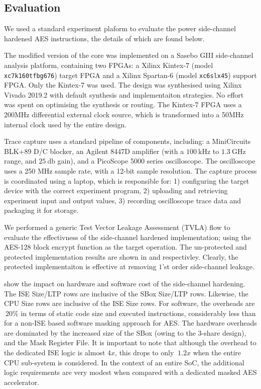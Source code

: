 \subsection{Evaluation}

We used a standard experiment plaform to evaluate the power side-channel
hardened AES  instructions, the details of which are found
below.

The modified version of the  core was implemented on a
Sasebo GIII \cite{HKSS:12}
side-channel analysis platform, containing two FPGAs:
a Xilinx  Kintex-7 
(model {\tt xc7k160tfbg676})
target  FPGA 
and
a Xilinx Spartan-6
(model {\tt xc6slx45})
support FPGA.
Only the Kintex-7 was used.
The design was synthesised using Xilinx Vivado 2019.2 with
default synthesis and implementaiton strategies.
No effort was spent on optimising the synthesis or routing.
The Kintex-7 FPGA uses a 200MHz differential external clock source, which is
transformed into a 50MHz internal clock used by the entire
design.

Trace capture uses a standard pipeline of components, including:
a MiniCircuits BLK+89 D/C blocker,
an Agilent 8447D amplifier (with a $\SI{100}{\kilo\hertz}$ to $\SI{1.3}{\giga\hertz}$ range, and $\SI{25}{\decibel}$ gain),
and
a  PicoScope 5000 series oscilloscope.
The oscilloscope uses a 250 MHz sample rate, with a 12-bit sample resolution.
The capture process is coordinated using a laptop, which is responsible for:
1) configuring the target device with the correct experiment program,
2) uploading and retrieving experiment input and output values,
3) recording oscilloscope trace data and packaging it for storage.

We performed a generic Test Vector Leakage Assessment (TVLA) flow to evaluate
the effectivness of the side-channel hardened implementation;
using the AES-128 block encrypt function as the target operation.
The un-protected and protected implementation results are shown in
 and
 respectivley.
Clearly, the protected implementaiton is effective at removing $1$'st
order side-channel leakage.

 show the impact on hardware and software cost
of the side-channel hardening.
The ISE Size/LTP rows are inclusive of the SBox Size/LTP rows.
Likewise, the CPU Size rows are inclusive of the ISE Size rows.
For software, the overheads are $~20\%$
in terms of static code size and executed instructions, considerably
less than for a non-ISE based software masking approach for AES.
The hardware overheads are dominated by the increased size of the
SBox (owing to the 3-share design), and the Mask Register File.
It is important to note that although the overhead to the dedicated
ISE logic is almost $4x$, this drops to only $~1.2x$ when the entire
CPU sub-system is considered.
In the context of an entire SoC, the additional logic requirements
are very modest when compared with a dedicated masked AES accelerator.

